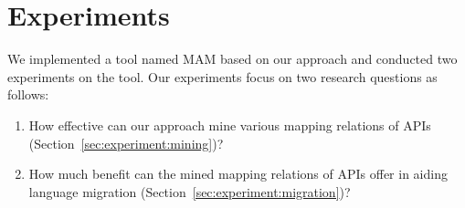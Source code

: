 \section{Experiments}
\label{sec:experiment} We implemented a tool named MAM based on our
approach and conducted two experiments on the tool. Our experiments
focus on two research questions as follows:
\vspace*{-1.5ex}\begin{enumerate}
\item How effective can our approach mine various mapping relations of APIs
(Section~\ref{sec:experiment:mining})? \vspace*{-1.5ex}
\item How much benefit can the mined mapping relations of APIs offer in aiding language
migration (Section~\ref{sec:experiment:migration})?\vspace*{-1.5ex}
\end{enumerate}%
